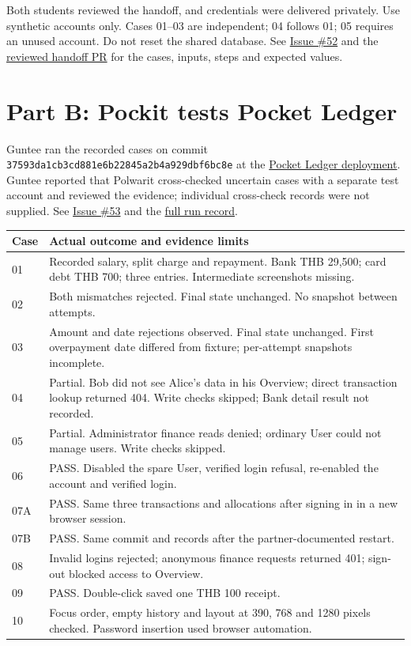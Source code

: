 \documentclass[11pt,a4paper]{article}
\newcommand{\issue}[1]{\href{https://github.com/CPE334-Pockit/Pockit/issues/#1}{Issue \##1}}
\begin{document}
Both students reviewed the handoff, and credentials were delivered privately. Use synthetic accounts only. Cases 01--03 are independent; 04 follows 01; 05 requires an unused account. Do not reset the shared database. See \issue{52} and the \href{https://github.com/CPE334-Pockit/Pockit/pull/74}{reviewed handoff PR} for the cases, inputs, steps and expected values.

\section{Part B: Pockit tests Pocket Ledger}
Guntee ran the recorded cases on commit \texttt{37593da1cb3cd881e6b22845a2b4a929dbf6bc8e} at the \href{https://pocket-ledger-468473091761.asia-southeast3.run.app/}{Pocket Ledger deployment}. Guntee reported that Polwarit cross-checked uncertain cases with a separate test account and reviewed the evidence; individual cross-check records were not supplied. See \issue{53} and the \href{https://github.com/CPE334-Pockit/Pockit/blob/1115d28/docs/labs/lab-06/peer-uat/evidence/run.md}{full run record}.

\begin{tabularx}{\linewidth}{lX}
Case & Actual outcome and evidence limits \\\hline
01 & Recorded salary, split charge and repayment. Bank THB 29,500; card debt THB 700; three entries. Intermediate screenshots missing. \\
02 & Both mismatches rejected. Final state unchanged. No snapshot between attempts. \\
03 & Amount and date rejections observed. Final state unchanged. First overpayment date differed from fixture; per-attempt snapshots incomplete. \\
04 & Partial. Bob did not see Alice's data in his Overview; direct transaction lookup returned 404. Write checks skipped; Bank detail result not recorded. \\
05 & Partial. Administrator finance reads denied; ordinary User could not manage users. Write checks skipped. \\
06 & PASS. Disabled the spare User, verified login refusal, re-enabled the account and verified login. \\
07A & PASS. Same three transactions and allocations after signing in in a new browser session. \\
07B & PASS. Same commit and records after the partner-documented restart. \\
08 & Invalid logins rejected; anonymous finance requests returned 401; sign-out blocked access to Overview. \\
09 & PASS. Double-click saved one THB 100 receipt. \\
10 & Focus order, empty history and layout at 390, 768 and 1280 pixels checked. Password insertion used browser automation. \\
\end{tabularx}
\end{document}
